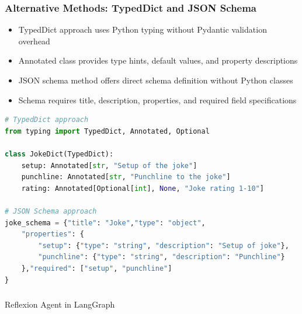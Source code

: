 \begin{frame}[fragile]\frametitle{Alternative Methods: TypedDict and JSON Schema}
      \begin{itemize}
	\item TypedDict approach uses Python typing without Pydantic validation overhead
	\item Annotated class provides type hints, default values, and property descriptions
	\item JSON schema method offers direct schema definition without Python classes
	\item Schema requires title, description, properties, and required field specifications
	  \end{itemize}

\begin{lstlisting}[language=Python, basicstyle=\tiny\ttfamily]
# TypedDict approach
from typing import TypedDict, Annotated, Optional

class JokeDict(TypedDict):
    setup: Annotated[str, "Setup of the joke"]
    punchline: Annotated[str, "Punchline to the joke"]
    rating: Annotated[Optional[int], None, "Joke rating 1-10"]

# JSON Schema approach
joke_schema = {"title": "Joke","type": "object",
    "properties": {
        "setup": {"type": "string", "description": "Setup of joke"},
        "punchline": {"type": "string", "description": "Punchline"}
    },"required": ["setup", "punchline"]
}
\end{lstlisting}
\end{frame}
\begin{frame}[fragile]\frametitle{}
\begin{center}
{\Large Reflexion Agent in LangGraph}
\end{center}
\end{frame}
